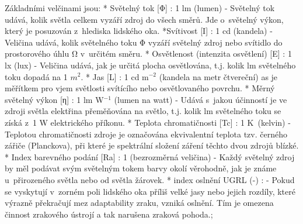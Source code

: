 Základními velčinami jsou:
\begitems
* {\sbf Světelný tok [Φ]} : 1 lm (lumen) - Světelný tok udává, kolik světla celkem vyzáří zdroj do všech směrů.
    Jde o~světelný výkon, který je posuzován z~hlediska lidského oka.
*{\sbf Svítivost [I]} : 1 cd (kandela) - Veličina udává, kolik světelného toku Φ vyzáří světelný zdroj nebo svítidlo
    do prostorového úhlu Ω v~určitém směru.
* {\sbf Osvětlenost (intenzita osvětlení) [E]} : 1 lx (lux) - Veličina udává, jak je určitá plocha osvětlována,
    t.j. kolik lm světelného toku dopadá na 1 $m^2$.
* {\sbf Jas [L]} : 1 cd m$^{-2}$ (kandela na metr čtvereční)
    as je měřítkem pro vjem světlosti svítícího nebo osvětlovaného povrchu.
* {\sbf Měrný světelný výkon [η]} : 1 lm W$^{-1}$ (lumen na watt) -
    Udává s~jakou účinností je ve zdroji světla elektřina přeměňována na světlo, t.j. kolik
    lm světelného toku se získá z~1 W elektrického příkonu.
* {\sbf Teplota chromatičnosti [Tc]} : 1 K~(kelvin) - Teplotou chromatičnosti zdroje je označována ekvivalentní
    teplota tzv. černého zářiče (Planckova), při které je spektrální složení záření těchto dvou zdrojů blízké.
* {\sbf Index barevného podání [Ra]} : 1 (bezrozměrná veličina) -
    Každý světelný zdroj by měl podávat svým světelným tokem barvy okolí věrohodně, jak je známe u~přirozeného
    světla nebo od světla žárovek.
* {\sbf index oslnění UGRL (-)} : - Pokud se vyskytují v~zorném poli lidského oka příliš velké jasy nebo jejich
    rozdíly, které výrazně překračují mez adaptability zraku, vzniká oslnění. Tím je omezena činnost zrakového ústrojí a
    tak narušena zraková pohoda.;
\enditems







